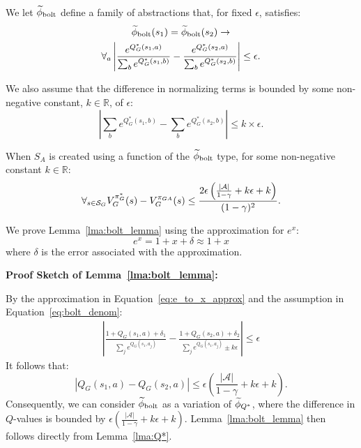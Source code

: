 \bdefn{$\epB$}
We let $\epB$ define a family of abstractions that, for fixed $\epsilon$, satisfies:
\begin{multline}
\widetilde \phi_{\text{bolt}}(s_1) = \widetilde \phi_{\text{bolt}}(s_2) \rightarrow \\
\forall_{a} \left|\frac{e^{Q_G^*(s_1,a)}}{\sum_b e^{Q_G^*(s_1,b)}} - \frac{e^{Q_G^*(s_2,a)}}{\sum_b e^{Q_G^*(s_2,b)}}\right| \leq \epsilon.
\label{eq:phi_bolt}
\end{multline}
\edefn
{}

We also assume that the difference in normalizing terms is bounded by some non-negative constant, $k\in \mathbb{R}$, of $\epsilon$:
\begin{equation}
\left| \sum_b e^{Q_G^*(s_1,b)} - \sum_b e^{Q_G^*(s_2,b)} \right| \leq k\times\epsilon.
\label{eq:bolt_denom}
\end{equation}
\begin{lma} When $S_A$ is created using a function of the $\epB$ type, for some non-negative constant $k \in \mathbb{R}$:
\begin{equation}
\forall_{s \in \mathcal{S}_G} V_G^{\pi^*_G}(s) - V_G^{\pi_{GA}}(s) \leq \frac{2\epsilon\left(\frac{|\mathcal{A}|}{1-\gamma} + k\epsilon + k\right)}{(1-\gamma)^2}.
\end{equation}
\label{lma:bolt_lemma}
\end{lma}
We prove Lemma~\ref{lma:bolt_lemma} using the approximation for $e^x$:
\begin{equation}
 e^x = 1 + x + \delta  \approx 1 + x
\label{eq:e_to_x_approx}
\end{equation}
where $\delta$ is the error associated with the approximation.

{\bf Proof Sketch of Lemma~\ref{lma:bolt_lemma}:}

By the approximation in Equation~\ref{eq:e_to_x_approx} and the assumption in Equation~\ref{eq:bolt_denom}:
\begin{align*}
\left|\frac{1 + Q_G(s_1,a) + \delta_1}{\sum_j e^{Q_G(s_1,a_j)}} - \frac{1 + Q_G(s_2,a) + \delta_2}{\sum_j e^{Q_G(s_1,a_j)} \pm k\epsilon}\right| \leq \epsilon
\end{align*}
It follows that:
\begin{equation}
\left|Q_G(s_1,a) - Q_G(s_2,a)\right| \leq \epsilon \left(\frac{|\mathcal{A}|}{1-\gamma} + k\epsilon + k \right).
\label{eq:bolt_qs}
\end{equation}
Consequently, we can consider $\epB$ as a variation of $\widetilde \phi_{Q^*}$, where the difference in $Q$-values is bounded by $\epsilon \left(\frac{|\mathcal{A}|}{1-\gamma} + k\epsilon + k \right)$. Lemma~\ref{lma:bolt_lemma} then follows directly from Lemma~\ref{lma:Q*}.

